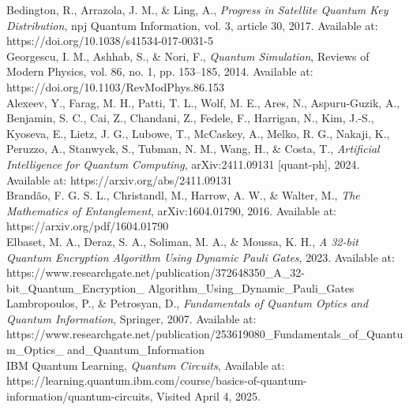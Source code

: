 \noindent[33] Bedington, R., Arrazola, J. M., \& Ling, A., \textit{Progress in Satellite Quantum Key Distribution}, npj Quantum Information, vol. 3, article 30, 2017. Available at: https://doi.org/10.1038/s41534-017-0031-5\\

\noindent[34] Georgescu, I. M., Ashhab, S., \& Nori, F., \textit{Quantum Simulation}, Reviews of Modern Physics, vol. 86, no. 1, pp. 153–185, 2014. Available at: https://doi.org/10.1103/RevModPhys.86.153\\

\noindent[35] Alexeev, Y., Farag, M. H., Patti, T. L., Wolf, M. E., Ares, N., Aspuru-Guzik, A., Benjamin, S. C., Cai, Z., Chandani, Z., Fedele, F., Harrigan, N., Kim, J.-S., Kyoseva, E., Lietz, J. G., Lubowe, T., McCaskey, A., Melko, R. G., Nakaji, K., Peruzzo, A., Stanwyck, S., Tubman, N. M., Wang, H., \& Costa, T., \textit{Artificial Intelligence for Quantum Computing}, arXiv:2411.09131 [quant-ph], 2024. Available at: https://arxiv.org/abs/2411.09131\\


\noindent[36] Brandão, F. G. S. L., Christandl, M., Harrow, A. W., \& Walter, M., \textit{The Mathematics of Entanglement}, arXiv:1604.01790, 2016. Available at: https://arxiv.org/pdf/1604.01790\\

\noindent[37] Elbaset, M. A., Deraz, S. A., Soliman, M. A., \& Moussa, K. H., \textit{A 32-bit Quantum Encryption Algorithm Using Dynamic Pauli Gates}, 2023. Available at: https://www.researchgate.net/publication/372648350\_A\_32-bit\_Quantum\_Encryption\_
\noindent Algorithm\_Using\_Dynamic\_Pauli\_Gates\\

\noindent[38] Lambropoulos, P., \& Petrosyan, D., \textit{Fundamentals of Quantum Optics and Quantum Information}, Springer, 2007. Available at: https://www.researchgate.net/publication/253619080\_Fundamentals\_of\_Quantum\_Optics\_
\noindent and\_Quantum\_Information\\

\noindent[39] IBM Quantum Learning, \textit{Quantum Circuits}, Available at: https://learning.quantum.ibm.com/course/basics-of-quantum-information/quantum-circuits, Visited April 4, 2025.\\


